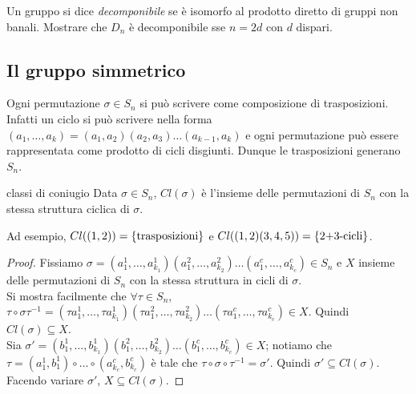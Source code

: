 \begin{exercise}
    Un gruppo si dice \emph{decomponibile} se è isomorfo al prodotto diretto di gruppi non banali. Mostrare che $D_n$ è decomponibile sse $n = 2d$ con $d$ dispari.
\end{exercise}

\subsection{Il gruppo simmetrico}

Ogni permutazione $\sigma \in S_n$ si può scrivere come composizione di trasposizioni. Infatti un ciclo si può scrivere nella forma $(a_1, \dots, a_k) = (a_1, a_2)(a_2,a_3)\dots(a_{k-1},a_k)$ e ogni permutazione può essere rappresentata come prodotto di cicli disgiunti. Dunque le trasposizioni generano $S_n$.

\begin{proposition}{classi di coniugio}
    Data $\sigma \in S_n$, $Cl(\sigma)$ è l'insieme delle permutazioni di $S_n$ con la stessa struttura ciclica di $\sigma$.
    
    Ad esempio, $Cl((1,2)) = \left\{ \text{trasposizioni} \right\}$ e $Cl((1,2)(3,4,5)) = \left\{ \text{2+3-cicli} \right\}$.
\end{proposition}
\begin{proof}
    Fissiamo $\sigma = (a^1_1, \dots, a^1_{k_1})(a^2_1, \dots, a^2_{k_2}) \dots (a^c_1, \dots, a^c_{k_c})\in S_n$ e $X$ insieme delle permutazioni di $S_n$ con la stessa struttura in cicli di $\sigma$. \\
    Si mostra facilmente che $\forall \tau \in S_n$, $\tau\circ\sigma\tau^{-1} = (\tau{a^1_1}, \dots, \tau{a^1_{k_1}})(\tau{a^2_1}, \dots, \tau{a^2_{k_2}}) \dots (\tau{a^c_1}, \dots, \tau{a^c_{k_c}}) \in X$. Quindi $Cl(\sigma)\subseteq X$. \\
    Sia $\sigma ' = (b^1_1, \dots, b^1_{k_1})(b^2_1, \dots, b^2_{k_2}) \dots (b^c_1, \dots, b^c_{k_c}) \in X$; notiamo che $\tau = (a^1_1,b^1_1)\circ\dots \circ (a^c_{k_c},b^c_{k_c})$ è tale che $\tau\circ \sigma\circ \tau^{-1} = \sigma'$. Quindi $\sigma' \subseteq Cl(\sigma)$. Facendo variare $\sigma'$, $X \subseteq Cl(\sigma)$. 
\end{proof}

